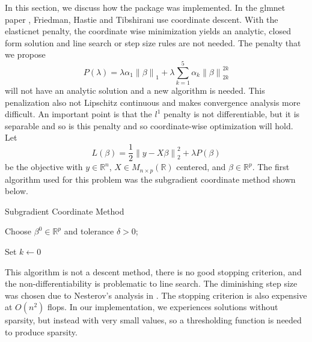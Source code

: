 \documentclass[12pt, a4paper, reqno]{article}
\numberwithin{equation}{section}
\newcommand{\norm}[1]{\left\lVert#1\right\rVert}
\newcommand{\R}{\mathbb{R}}
\begin{document}
In this section, we discuss how the package was implemented.
In the glmnet paper \cite{glmnet}, Friedman, Hastie and Tibshirani use coordinate descent.
With the elasticnet \cite{elasticnet} penalty, the coordinate wise minimization yields an analytic, closed form solution and line search or step size rules are not needed. The penalty that we propose
\[
P(\lambda) = \lambda \alpha_1 \norm{\beta}_1 + \lambda \sum_{k = 1}^{5} \alpha_k \norm{\beta}_{2k}^{2k} 
\]
will not have an analytic solution and a new algorithm is needed.
This penalization also not Lipschitz continuous and makes convergence analysis more difficult.
An important point is that the $l^1$ penalty is not differentiable, but it is separable and so is this penalty and so coordinate-wise optimization will hold.
Let 
\[
L(\beta) = \frac{1}{2} \norm{y - X \beta}_2^2 + \lambda P(\beta)
\]
be the objective with $y \in \R^n$, $X \in M_{n \times p}(\R)$ centered, and $\beta \in \R^p$.
The first algorithm used for this problem was the subgradient coordinate method shown below.

\vspace{.5cm}
\begin{algorithm}[H]
\caption{Subgradient Coordinate Method}
Choose $\beta^0 \in \R^p$ and tolerance $\delta > 0$;

Set $k \gets 0$


\end{algorithm}
\vspace{.5cm}

This algorithm is not a descent method, there is no good stopping criterion, and the non-differentiability is problematic to line search.
The diminishing step size was chosen due to Nesterov's analysis in \cite{nesterov}.
The stopping criterion is also expensive at $O(n^2)$ flops.
In our implementation, we experiences solutions without sparsity, but instead with very small values, so a thresholding function is needed to produce sparsity.
\end{document}
